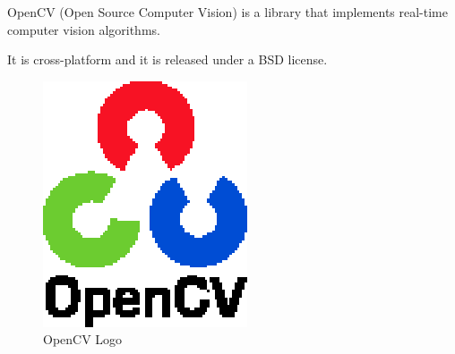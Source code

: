 
OpenCV\cite{opencv} (Open Source Computer Vision) is a library that implements real-time computer vision algorithms. 

It is cross-platform and it is released under a BSD\cite{BSD} license.

\begin{figure}[h]
	\begin{center}
    \includegraphics[scale=1]{img/opencv/logo.eps}
	\caption[OpenCV Logo]{OpenCV Logo}
	\end{center}
\end{figure}
